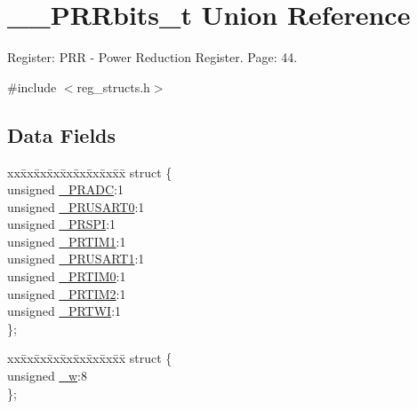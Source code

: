 \hypertarget{union_____p_r_rbits__t}{\section{\+\_\+\+\_\+\+P\+R\+Rbits\+\_\+t Union Reference}
\label{union_____p_r_rbits__t}
}


Register\+: P\+R\+R -\/ Power Reduction Register. Page\+: 44.  




{\ttfamily \#include $<$reg\+\_\+structs.\+h$>$}

\subsection*{Data Fields}
\begin{DoxyCompactItemize}
\item 
\begin{tabbing}
xx\=xx\=xx\=xx\=xx\=xx\=xx\=xx\=xx\=\kill
struct \{\\
\>unsigned \hyperlink{union_____p_r_rbits__t_a3b82644cf3f24a1a18fbbaf8823817e6}{\_PRADC}:1\\
\>unsigned \hyperlink{union_____p_r_rbits__t_a315db837c5a5e2008c9319f62a437577}{\_PRUSART0}:1\\
\>unsigned \hyperlink{union_____p_r_rbits__t_a66326bc6af2d4e834db931f489592c57}{\_PRSPI}:1\\
\>unsigned \hyperlink{union_____p_r_rbits__t_a63bde66c276303b4be4f501fa9da4852}{\_PRTIM1}:1\\
\>unsigned \hyperlink{union_____p_r_rbits__t_aa65141eec9122fa83bd614684c82fbd8}{\_PRUSART1}:1\\
\>unsigned \hyperlink{union_____p_r_rbits__t_a5c8145bfb802fe08785ee6d0248aaedf}{\_PRTIM0}:1\\
\>unsigned \hyperlink{union_____p_r_rbits__t_a2da945cdab01b8eeac81deb02c706a44}{\_PRTIM2}:1\\
\>unsigned \hyperlink{union_____p_r_rbits__t_a7c7dc9f58b68b79e44a5a318435fe3fb}{\_PRTWI}:1\\
\}; \\

\end{tabbing}\item 
\begin{tabbing}
xx\=xx\=xx\=xx\=xx\=xx\=xx\=xx\=xx\=\kill
struct \{\\
\>unsigned \hyperlink{union_____p_r_rbits__t_a1b8bc02cf5b812065bc29ecb697b5337}{\_w}:8\\
\}; \\

\end{tabbing}\end{DoxyCompactItemize}


